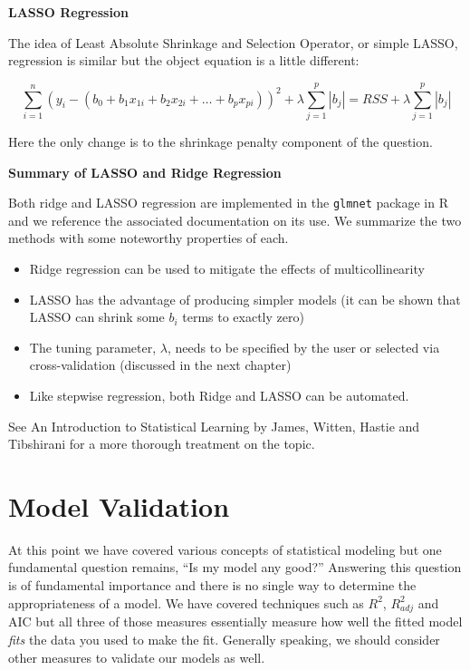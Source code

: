 \documentclass[
]{book}
\providecommand{\tightlist}{%
  \setlength{\itemsep}{0pt}\setlength{\parskip}{0pt}}
\begin{document}
\textbf{LASSO Regression}

The idea of Least Absolute Shrinkage and Selection Operator, or simple LASSO, regression is similar but the object equation is a little different:

\[\sum_{i=1}^n \left(y_i - (b_0 + b_1 x_{1i} + b_2 x_{2i} + \ldots + b_p x_{pi})\right)^2 + \lambda\sum_{j=1}^p |b_j| = RSS + \lambda\sum_{j=1}^p |b_j|\]

Here the only change is to the shrinkage penalty component of the question.

\textbf{Summary of LASSO and Ridge Regression}

Both ridge and LASSO regression are implemented in the \texttt{glmnet} package in R and we reference the associated documentation on its use. We summarize the two methods with some noteworthy properties of each.

\begin{itemize}
\tightlist
\item
  Ridge regression can be used to mitigate the effects of multicollinearity
\item
  LASSO has the advantage of producing simpler models (it can be shown that LASSO can shrink some \(b_i\) terms to exactly zero)
\item
  The tuning parameter, \(\lambda\), needs to be specified by the user or selected via cross-validation (discussed in the next chapter)
\item
  Like stepwise regression, both Ridge and LASSO can be automated.
\end{itemize}

See An Introduction to Statistical Learning by James, Witten, Hastie and Tibshirani for a more thorough treatment on the topic.

\hypertarget{model-validation}{%
\chapter{Model Validation}\label{model-validation}}

At this point we have covered various concepts of statistical modeling but one fundamental question remains, ``Is my model any good?''
Answering this question is of fundamental importance and there is no single way to determine the appropriateness of a model.
We have covered techniques such as \(R^2\), \(R^2_{adj}\) and AIC but all three of those measures essentially measure how well the fitted model \emph{fits} the data you used to make the fit.
Generally speaking, we should consider other measures to validate our models as well.
\end{document}
